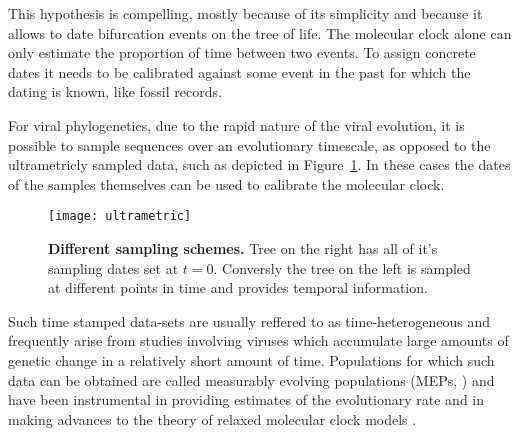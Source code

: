 This hypothesis is compelling, mostly because of its simplicity and because it allows to date bifurcation events on the tree of life.
The molecular clock alone can only estimate the proportion of time between two events. 
To assign concrete dates it needs to be calibrated against some event in the past for which the dating is known, like fossil records.

For viral phylogenetics, due to the rapid nature of the viral evolution, it is possible to sample sequences over an evolutionary timescale, as opposed to the ultrametricly sampled data, such as depicted in Figure~\ref{fig:ultrametric}.
In these cases the dates of the samples themselves can be used to calibrate the molecular clock.



\begin{figure}[H]
\centering
\texttt{[image: ultrametric]} 
\caption{
{ \footnotesize 
{\bf Different sampling schemes.} Tree on the right has all of it's sampling dates set at $t=0$. Conversly the tree on the left is sampled at different points in time and provides temporal information.
}%
}
\label{fig:ultrametric}
\end{figure}

Such time stamped data-sets are usually reffered to as time-heterogeneous and frequently arise from studies involving viruses which accumulate large amounts of genetic change in a relatively short amount of time.
Populations for which such data can be obtained are called measurably evolving populations (MEPs, \cite{Drummond2003}) and have been instrumental in providing estimates of the evolutionary rate and in making advances to the theory of relaxed molecular clock models \citep{Drummond2006}.

